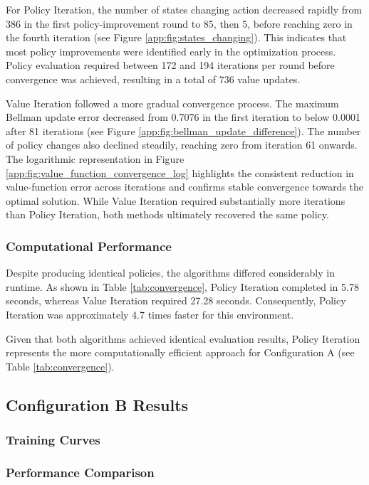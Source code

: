 \documentclass[11pt,a4paper]{article}
\begin{document}
For Policy Iteration, the number of states changing action decreased rapidly from 386 in the first policy-improvement 
round to 85, then 5, before reaching zero in the fourth iteration (see Figure \ref{app:fig:states_changing}). 
This indicates that most policy improvements were identified early in the optimization process. 
Policy evaluation required between 172 and 194 iterations per round before convergence was achieved, 
resulting in a total of 736 value updates.

Value Iteration followed a more gradual convergence process. 
The maximum Bellman update error decreased from 0.7076 in the first iteration to below 0.0001 after 81 iterations 
(see Figure \ref{app:fig:bellman_update_difference}). 
The number of policy changes also declined steadily, reaching zero from iteration 61 onwards. 
The logarithmic representation in Figure \ref{app:fig:value_function_convergence_log} 
highlights the consistent reduction in value-function error across iterations and confirms stable convergence 
towards the optimal solution. While Value Iteration required substantially more iterations than Policy Iteration, 
both methods ultimately recovered the same policy.


\subsubsection{Computational Performance}
Despite producing identical policies, the algorithms differed considerably in runtime. 
As shown in Table \ref{tab:convergence}, Policy Iteration completed in 5.78 seconds, whereas Value Iteration required 27.28 seconds. 
Consequently, Policy Iteration was approximately 4.7 times faster for this environment.

Given that both algorithms achieved identical evaluation results, 
Policy Iteration represents the more computationally efficient approach for Configuration A (see Table \ref{tab:convergence}).

\subsection{Configuration B Results}
\subsubsection{Training Curves}
\subsubsection{Performance Comparison}
\end{document}
